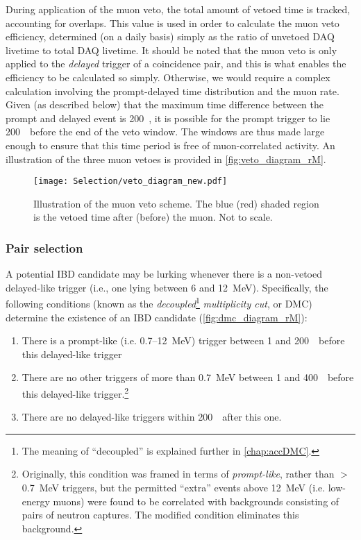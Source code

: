 \documentclass[../thesis.tex]{subfiles}
\begin{document}
During application of the muon veto, the total amount of vetoed time is tracked, accounting for overlaps. This value is used in order to calculate the muon veto efficiency, determined (on a daily basis) simply as the ratio of unvetoed DAQ livetime to total DAQ livetime. It should be noted that the muon veto is only applied to the \emph{delayed} trigger of a coincidence pair, and this is what enables the efficiency to be calculated so simply. Otherwise, we would require a complex calculation involving the prompt-delayed time distribution and the muon rate. Given (as described below) that the maximum time difference between the prompt and delayed event is 200~\us, it is possible for the prompt trigger to lie 200~\us\ before the end of the veto window. The windows are thus made large enough to ensure that this time period is free of muon-correlated activity. An illustration of the three muon vetoes is provided in \autoref{fig:veto_diagram_rM}.

\begin{figure}[h!]
  \texttt{[image: Selection/veto\_diagram\_new.pdf]}
  \caption{Illustration of the muon veto scheme. The blue (red) shaded region is the vetoed time after (before) the muon. Not to scale.}
  \label{fig:veto_diagram_rM}
\end{figure}

\subsubsection{Pair selection}
\label{sec:pairSel}

A potential IBD candidate may be lurking whenever there is a non-vetoed delayed-like trigger (i.e., one lying between 6 and 12~MeV). Specifically, the following conditions (known as the \emph{decoupled}\footnote{The meaning of ``decoupled'' is explained further in \autoref{chap:accDMC}.} \emph{multiplicity cut}, or DMC) determine the existence of an IBD candidate (\autoref{fig:dmc_diagram_rM}):

\begin{enumerate}
\item There is a prompt-like (i.e. 0.7--12~MeV) trigger between 1 and 200~\us\ before this delayed-like trigger
\item There are no other triggers of more than 0.7~MeV between 1 and 400~\us\ before this delayed-like trigger.\footnote{Originally, this condition was framed in terms of \emph{prompt-like}, rather than $>$0.7~MeV triggers, but the permitted ``extra'' events above 12~MeV (i.e. low-energy muons) were found to be correlated with backgrounds consisting of pairs of neutron captures. The modified condition eliminates this background.}
\item There are no delayed-like triggers within 200~\us\ after this one.
\end{enumerate}
\end{document}
